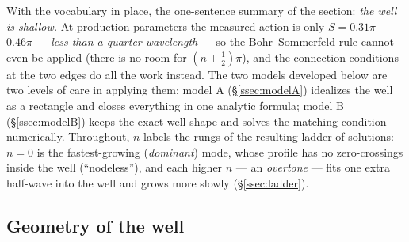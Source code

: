 \documentclass[11pt,a4paper]{article}
\numberwithin{equation}{section}
\theoremstyle{remark}
\begin{document}
With the vocabulary in place, the one-sentence summary of the section:
\emph{the well is shallow.} At production parameters the measured
action is only $S=0.31\pi$--$0.46\pi$ --- \emph{less than a quarter
wavelength} --- so the Bohr--Sommerfeld rule cannot even be applied
(there is no room for $(n+\tfrac12)\pi$), and the connection conditions
at the two edges do all the work instead. The two models developed
below are two levels of care in applying them: model A
(\S\ref{ssec:modelA}) idealizes the well as a rectangle and closes
everything in one analytic formula; model B (\S\ref{ssec:modelB}) keeps
the exact well shape and solves the matching condition numerically.
Throughout, $n$ labels the rungs of the resulting ladder of solutions:
$n=0$ is the fastest-growing (\emph{dominant}) mode, whose profile has
no zero-crossings inside the well (``nodeless''), and each higher $n$
--- an \emph{overtone} --- fits one extra half-wave into the well and
grows more slowly (\S\ref{ssec:ladder}).

\subsection{Geometry of the well}
\label{ssec:wellgeom}
\end{document}
